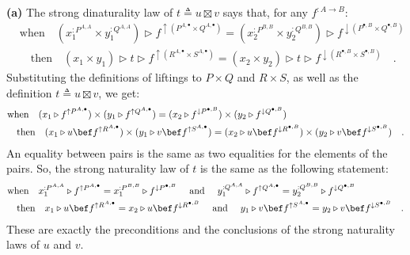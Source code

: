 \textbf{(a)} The strong dinaturality law of $t\triangleq u\boxtimes v$
says that, for any $f^{:A\rightarrow B}$:
\begin{align*}
 & \text{when}\quad(x_{1}^{:P^{A,A}}\times y_{1}^{:Q^{A,A}})\triangleright f^{\uparrow(P^{A,\bullet}\times Q^{A,\bullet})}=(x_{2}^{:P^{B,B}}\times y_{2}^{:Q^{B,B}})\triangleright f^{\downarrow(P^{\bullet,B}\times Q^{\bullet,B})}\\
 & \quad\text{then}\quad(x_{1}\times y_{1})\triangleright t\triangleright f^{\uparrow(R^{A,\bullet}\times S^{A,\bullet})}=(x_{2}\times y_{2})\triangleright t\triangleright f^{\downarrow(R^{\bullet,B}\times S^{\bullet,B})}\quad.
\end{align*}
Substituting the definitions of liftings to $P\times Q$ and $R\times S$,
as well as the definition $t\triangleq u\boxtimes v$, we get:
\begin{align*}
 & \text{when}\quad(x_{1}\triangleright f^{\uparrow P^{A,\bullet}})\times(y_{1}\triangleright f^{\uparrow Q^{A,\bullet}})=(x_{2}\triangleright f^{\downarrow P^{\bullet,B}})\times(y_{2}\triangleright f^{\downarrow Q^{\bullet,B}})\\
 & \quad\text{then}\quad(x_{1}\triangleright u\bef f^{\uparrow R^{A,\bullet}})\times(y_{1}\triangleright v\bef f^{\uparrow S^{A,\bullet}})=(x_{2}\triangleright u\bef f^{\downarrow R^{\bullet,B}})\times(y_{2}\triangleright v\bef f^{\downarrow S^{\bullet,B}})\quad.
\end{align*}
An equality between pairs is the same as two equalities for the elements
of the pairs. So, the strong naturality law of $t$ is the same as
the following statement:
\begin{align*}
 & \text{when}\quad x_{1}^{:P^{A,A}}\triangleright f^{\uparrow P^{A,\bullet}}=x_{1}^{:P^{B,B}}\triangleright f^{\downarrow P^{\bullet,B}}\quad\text{ and }\quad y_{1}^{:Q^{A,A}}\triangleright f^{\uparrow Q^{A,\bullet}}=y_{2}^{:Q^{B,B}}\triangleright f^{\downarrow Q^{\bullet,B}}\\
 & \quad\text{then}\quad x_{1}\triangleright u\bef f^{\uparrow R^{A,\bullet}}=x_{2}\triangleright u\bef f^{\downarrow R^{\bullet,B}}\quad\text{ and }\quad y_{1}\triangleright v\bef f^{\uparrow S^{A,\bullet}}=y_{2}\triangleright v\bef f^{\downarrow S^{\bullet,B}}\quad.
\end{align*}
These are exactly the preconditions and the conclusions of the strong
naturality laws of $u$ and $v$.

